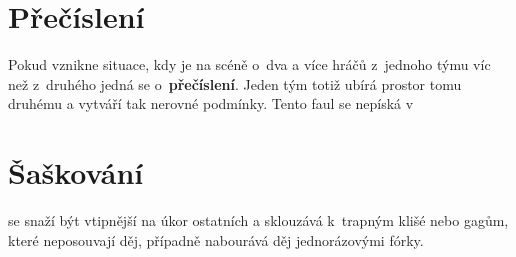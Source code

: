  
\needspace{5cm} \section{Přečíslení} \label{přečíslení}  
 
Pokud vznikne situace, kdy je na scéně o~dva a více hráčů z~jednoho týmu víc než z~druhého jedná se o~\textbf{přečíslení}. Jeden tým totiž ubírá prostor tomu druhému a vytváří tak nerovné podmínky. Tento faul se nepíská v~ 
 
 
\needspace{5cm} \section{Šaškování} \label{šaškování}  
 
 se snaží být vtipnější na úkor ostatních a sklouzává k~trapným klišé nebo gagům, které neposouvají děj, případně nabourává děj jednorázovými fórky. 
 
 

